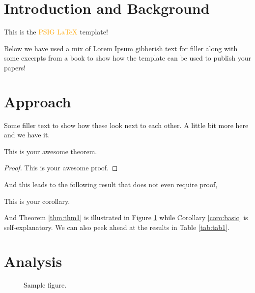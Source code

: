 \documentclass{psig_required_latex_files/psig}
\begin{document}
\section{Introduction and Background}\label{sec:introd}

{\Large This is the \textcolor{orange}{PSIG \LaTeX{}} template!  }

Below we have used a mix of Lorem Ipsum gibberish text for filler along with some excerpts from a book to show how the template can be used to publish your papers!


\section{Approach}

Some filler text to show how these look next to each other.  A little bit more here and we have it.

\begin{theorem}\label{thm:thm1}
This is your awesome theorem.
\end{theorem}
\begin{proof}
This is your awesome proof. 
\end{proof}
And this leads to the following result that does not even require proof,
\begin{corollary}\label{coro:basic}
This is your corollary.
\end{corollary}

And  Theorem \ref{thm:thm1} is illustrated in Figure \ref{fig:fig1} while  Corollary \ref{coro:basic} is self-explanatory.  We can also peek ahead at the results in Table \ref{tab:tab1}.


\section{Analysis}\label{sec2}

\lipsum[6-7]

\begin{figure}
\caption{Sample figure.
}\label{fig:fig1}
\end{figure}
\end{document}

